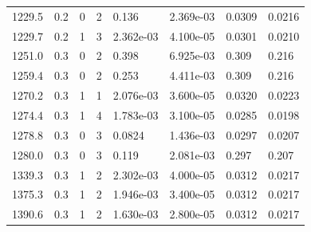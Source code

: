 \documentclass[preview]{standalone}
\begin{document}
{{{\begin{tabular}{L{1.2cm}C{1.2cm} C{0.3cm}C{0.5cm} C{1.4cm}C{1.4cm} C{1.4cm}C{1.4cm}}
  1229.5  &   0.2  & 0     &  2 &  0.136  & 2.369e-03  & 0.0309 &  0.0216   \\ 
  1229.7  &   0.2  & 1     &  3 &  2.362e-03  & 4.100e-05  & 0.0301 &  0.0210   \\ 
  1251.0  &   0.3  & 0     &  2 &  0.398  & 6.925e-03  & 0.309 &  0.216   \\ 
  1259.4  &   0.3  & 0     &  2 &  0.253  & 4.411e-03  & 0.309 &  0.216   \\ 
  1270.2  &   0.3  & 1     &  1 &  2.076e-03  & 3.600e-05  & 0.0320 &  0.0223   \\ 
  1274.4  &   0.3  & 1     &  4 &  1.783e-03  & 3.100e-05  & 0.0285 &  0.0198   \\ 
  1278.8  &   0.3  & 0     &  3 &  0.0824  & 1.436e-03  & 0.0297 &  0.0207   \\ 
  1280.0  &   0.3  & 0     &  3 &  0.119  & 2.081e-03  & 0.297 &  0.207   \\ 
  1339.3  &   0.3  & 1     &  2 &  2.302e-03  & 4.000e-05  & 0.0312 &  0.0217   \\ 
  1375.3  &   0.3  & 1     &  2 &  1.946e-03  & 3.400e-05  & 0.0312 &  0.0217   \\ 
  1390.6  &   0.3  & 1     &  2 &  1.630e-03  & 2.800e-05  & 0.0312 &  0.0217   \\ 
\hline 
\end{tabular} 

}}}
\end{document}
